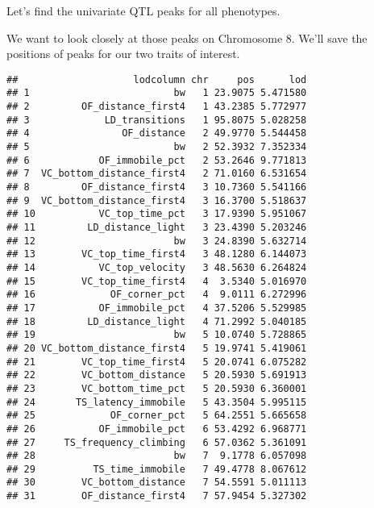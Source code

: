 \documentclass[oneside]{book}
\newenvironment{Shaded}{\begin{snugshade}}{\end{snugshade}}
\newcommand{\DataTypeTok}[1]{\textcolor[rgb]{0.13,0.29,0.53}{#1}}
\newcommand{\DecValTok}[1]{\textcolor[rgb]{0.00,0.00,0.81}{#1}}
\newcommand{\KeywordTok}[1]{\textcolor[rgb]{0.13,0.29,0.53}{\textbf{#1}}}
\newcommand{\NormalTok}[1]{#1}
\newcommand{\OperatorTok}[1]{\textcolor[rgb]{0.81,0.36,0.00}{\textbf{#1}}}
\newcommand{\StringTok}[1]{\textcolor[rgb]{0.31,0.60,0.02}{#1}}
\begin{document}
Let's find the univariate QTL peaks for all phenotypes.

We want to look closely at those peaks on Chromosome 8. We'll save the
positions of peaks for our two traits of interest.

\begin{Shaded}
\end{Shaded}

\begin{verbatim}
##                    lodcolumn chr     pos      lod
## 1                         bw   1 23.9075 5.471580
## 2         OF_distance_first4   1 43.2385 5.772977
## 3             LD_transitions   1 95.8075 5.028258
## 4                OF_distance   2 49.9770 5.544458
## 5                         bw   2 52.3932 7.352334
## 6            OF_immobile_pct   2 53.2646 9.771813
## 7  VC_bottom_distance_first4   2 71.0160 6.531654
## 8         OF_distance_first4   3 10.7360 5.541166
## 9  VC_bottom_distance_first4   3 16.3700 5.518637
## 10           VC_top_time_pct   3 17.9390 5.951067
## 11         LD_distance_light   3 23.4390 5.203246
## 12                        bw   3 24.8390 5.632714
## 13        VC_top_time_first4   3 48.1280 6.144073
## 14           VC_top_velocity   3 48.5630 6.264824
## 15        VC_top_time_first4   4  3.5340 5.016970
## 16             OF_corner_pct   4  9.0111 6.272996
## 17           OF_immobile_pct   4 37.5206 5.529985
## 18         LD_distance_light   4 71.2992 5.040185
## 19                        bw   5 10.0740 5.728865
## 20 VC_bottom_distance_first4   5 19.9741 5.419061
## 21        VC_top_time_first4   5 20.0741 6.075282
## 22        VC_bottom_distance   5 20.5930 5.691913
## 23        VC_bottom_time_pct   5 20.5930 6.360001
## 24       TS_latency_immobile   5 43.3504 5.995115
## 25             OF_corner_pct   5 64.2551 5.665658
## 26           OF_immobile_pct   6 53.4292 6.968771
## 27     TS_frequency_climbing   6 57.0362 5.361091
## 28                        bw   7  9.1778 6.057098
## 29          TS_time_immobile   7 49.4778 8.067612
## 30        VC_bottom_distance   7 54.5591 5.011113
## 31        OF_distance_first4   7 57.9454 5.327302

\end{verbatim}
\end{document}
